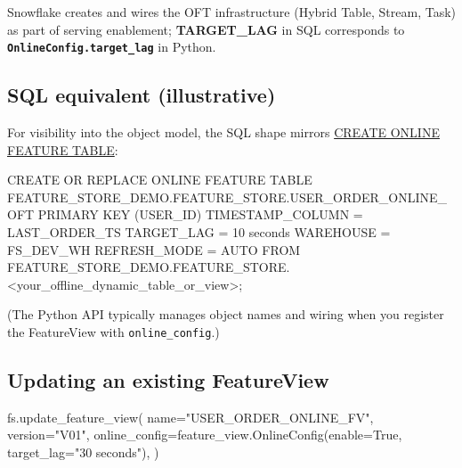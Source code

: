 \documentclass[
  letterpaper,
  DIV=11,
  numbers=noendperiod]{scrreprt}
\newenvironment{Shaded}{\begin{snugshade}}{\end{snugshade}}
\newcommand{\KeywordTok}[1]{\textcolor[rgb]{0.00,0.23,0.31}{#1}}
\newcommand{\NormalTok}[1]{\textcolor[rgb]{0.00,0.23,0.31}{#1}}
\newcommand{\OperatorTok}[1]{\textcolor[rgb]{0.37,0.37,0.37}{#1}}
\newcommand{\StringTok}[1]{\textcolor[rgb]{0.13,0.47,0.30}{#1}}
\newcommand{\VariableTok}[1]{\textcolor[rgb]{0.07,0.07,0.07}{#1}}
\begin{document}
Snowflake creates and wires the OFT infrastructure (Hybrid Table,
Stream, Task) as part of serving enablement; \textbf{TARGET\_LAG} in SQL
corresponds to \textbf{\texttt{OnlineConfig.target\_lag}} in Python.

\hypertarget{sql-equivalent-illustrative}{%
\subsection{SQL equivalent
(illustrative)}\label{sql-equivalent-illustrative}}

For visibility into the object model, the SQL shape mirrors
\href{https://docs.snowflake.com/en/sql-reference/sql/create-online-feature-table}{CREATE
ONLINE FEATURE TABLE}:

\begin{Shaded}
\begin{Highlighting}[]
\KeywordTok{CREATE} \KeywordTok{OR} \KeywordTok{REPLACE} \KeywordTok{ONLINE}\NormalTok{ FEATURE }\KeywordTok{TABLE}\NormalTok{ FEATURE\_STORE\_DEMO.FEATURE\_STORE.USER\_ORDER\_ONLINE\_OFT}
  \KeywordTok{PRIMARY} \KeywordTok{KEY}\NormalTok{ (USER\_ID)}
\NormalTok{  TIMESTAMP\_COLUMN }\OperatorTok{=}\NormalTok{ LAST\_ORDER\_TS}
\NormalTok{  TARGET\_LAG }\OperatorTok{=} \StringTok{\textquotesingle{}10 seconds\textquotesingle{}}
\NormalTok{  WAREHOUSE }\OperatorTok{=}\NormalTok{ FS\_DEV\_WH}
\NormalTok{  REFRESH\_MODE }\OperatorTok{=}\NormalTok{ AUTO}
\KeywordTok{FROM}\NormalTok{ FEATURE\_STORE\_DEMO.FEATURE\_STORE.}\OperatorTok{\textless{}}\NormalTok{your\_offline\_dynamic\_table\_or\_view}\OperatorTok{\textgreater{}}\NormalTok{;}
\end{Highlighting}
\end{Shaded}

(The Python API typically manages object names and wiring when you
register the FeatureView with \texttt{online\_config}.)

\hypertarget{updating-an-existing-featureview}{%
\subsection{Updating an existing
FeatureView}\label{updating-an-existing-featureview}}

\begin{Shaded}
\begin{Highlighting}[]
\NormalTok{fs.update\_feature\_view(}
\NormalTok{    name}\OperatorTok{=}\StringTok{"USER\_ORDER\_ONLINE\_FV"}\NormalTok{,}
\NormalTok{    version}\OperatorTok{=}\StringTok{"V01"}\NormalTok{,}
\NormalTok{    online\_config}\OperatorTok{=}\NormalTok{feature\_view.OnlineConfig(enable}\OperatorTok{=}\VariableTok{True}\NormalTok{, target\_lag}\OperatorTok{=}\StringTok{"30 seconds"}\NormalTok{),}
\NormalTok{)}
\end{Highlighting}
\end{Shaded}
\end{document}
